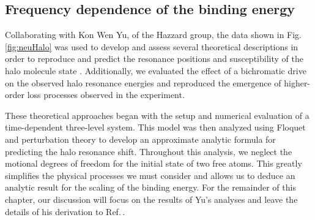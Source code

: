 %	
%
%	
%
%
%
%
%
%
%
%
%
%
%
%	
	
	
\subsection{Frequency dependence of the binding energy} \label{sec:highE_theory}		
Collaborating with Kon Wen Yu, of the Hazzard group, the data shown in Fig.\,\ref{fig:neuHalo} was used to develop and assess several theoretical descriptions in order to reproduce and predict the resonance positions and susceptibility of the halo molecule state \cite{Kon2018}.
Additionally, we evaluated the effect of a bichromatic drive on the observed halo resonance energies and reproduced the emergence of higher-order loss processes observed in the experiment.

These theoretical approaches began with the setup and numerical evaluation of a time-dependent three-level system.
This model was then analyzed using Floquet and perturbation theory to develop an approximate analytic formula for predicting the halo resonance shift.
Throughout this analysis, we neglect the motional degrees of freedom for the initial state of two free atoms.
This greatly simplifies the physical processes we must consider and allows us to deduce an analytic result for the scaling of the binding energy.
For the remainder of this chapter, our discussion will focus on the results of Yu's analyses and leave the details of his derivation to Ref.\,\cite{Kon2018}.

